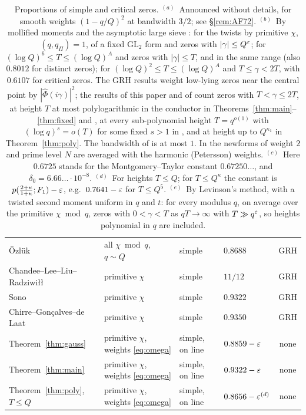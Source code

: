 \documentclass[11pt]{amsart}
\theoremstyle{definition}
\theoremstyle{remark}
\numberwithin{equation}{section}
\begin{document}
\begin{table}[ht]
\begin{tabular}{@{}llllc@{}}
\"Ozl\"uk \cite{Ozl96} & all $\chi\bmod q$, $q\sim Q$ & simple & $0.8688$ & GRH\\
Chandee--Lee--Liu--Radziwi\l\l{} \cite{CLLR} & primitive $\chi$ & simple & $11/12$ & GRH\\
Sono \cite{Sono16} & primitive $\chi$ & simple & $0.9322$ & GRH\\
Chirre--Gon\c calves--de Laat \cite{CGdL} & primitive $\chi$ & simple & $0.9350$ & GRH\\
\midrule
Theorem~\ref{thm:gauss} & primitive $\chi$, weights \eqref{eq:omega} & simple, on line & $0.8859-\varepsilon$ & none\\
Theorem~\ref{thm:main} & primitive $\chi$, weights \eqref{eq:omega} & simple, on line & $0.9322-\varepsilon$ & none\\
Theorem~\ref{thm:poly}, $T\le Q$ & primitive $\chi$, weights \eqref{eq:omega} & simple, on line & $0.8656-\varepsilon^{(d)}$ & none\\
\bottomrule
\end{tabular}
\caption{Proportions of simple and critical zeros. $^{(a)}$~Announced without details, for smooth weights $(1-q/Q)^2$ at bandwidth $3/2$; see \S\ref{rem:AF72}. $^{(b)}$~By mollified moments and the asymptotic large sieve \cite{CIS-ALS}: \cite{CKLT26} for the twists by primitive $\chi$, $(q,q_\Pi)=1$, of a fixed $\mathrm{GL}_2$ form and zeros with $|\gamma|\le Q^{\varepsilon}$; \cite{CIS13} for $(\log Q)^6\le T\le(\log Q)^A$ and zeros with $|\gamma|\le T$, and \cite{Wu16} in the same range (also $0.8012$ for distinct zeros); \cite{Sono25} for $(\log Q)^2\le T\le(\log Q)^A$ and $T\le\gamma<2T$, with $0.6107$ for critical zeros. The GRH results \cite{Ozl96,CLLR,Sono16,CGdL} weight low-lying zeros near the central point by $|\widehat\Phi(i\gamma)|^2$; the results of this paper and of \cite{HY26,HY26b,Pru26,Fab26} count zeros with $T<\gamma\le2T$, at height $T$ at most polylogarithmic in the conductor in Theorems~\ref{thm:main}--\ref{thm:fixed} and \cite{HY26,Pru26,Fab26}, at every sub-polynomial height $T=q^{o(1)}$ with $(\log q)^s=o(T)$ for some fixed $s>1$ in \cite{HY26b}, and at height up to $Q^{\kappa_1}$ in Theorem~\ref{thm:poly}. The bandwidth of \cite{HY26,HY26b,Pru26,Fab26} is at most $1$. In \cite{Fab26} the newforms of weight $2$ and prime level $N$ are averaged with the harmonic (Petersson) weights. $^{(c)}$~Here $0.6725$ stands for the Montgomery--Taylor constant $0.67250\ldots$, and $\delta_0=6.66\ldots\cdot10^{-8}$. $^{(d)}$~For heights $T\le Q$; for $T\le Q^\kappa$ the constant is $p(\frac{2+\kappa}{1+\kappa};F_1)-\varepsilon$, e.g.\ $0.7641-\varepsilon$ for $T\le Q^5$. $^{(e)}$~By Levinson's method, with a twisted second moment uniform in $q$ and $t$: for every modulus $q$, on average over the primitive $\chi\bmod q$, zeros with $0<\gamma<T$ as $qT\to\infty$ with $T\gg q^{\varepsilon}$, so heights polynomial in $q$ are included.}
\label{tab:context}
\end{table}
\end{document}
